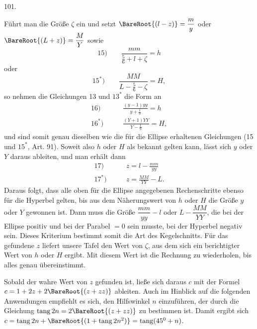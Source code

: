 \par{}\medskip
\hypertarget{native-141-article101}{}
\begin{center}101.\end{center}
Führt man die Größe $\zeta$ ein und setzt $\BareRoot{(l-z)}=\dfrac my$ oder $\BareRoot{(L+z)}=\dfrac MY$ sowie
\[
\mathrm{15)}\qquad\frac{mm}{\tfrac56+l+\zeta}=h
\]
\noindent oder
\[
\mathrm{15^*)}\qquad\frac{MM}{L-\tfrac56-\zeta}=H,
\]
\noindent so nehmen die Gleichungen 13 und $13^*$ die Form an
\[
\begin{aligned}
\mathrm{16)}\qquad&\frac{(y-1)yy}{y+\tfrac19}=h\\[.6em]
\mathrm{16^*)}\qquad&\frac{(Y+1)YY}{Y-\tfrac19}=H,
\end{aligned}
\]
\noindent und sind somit genau dieselben wie die für die Ellipse erhaltenen Gleichungen (15 und $15^*$, Art. 91). Soweit also $h$ oder $H$ als bekannt gelten kann, lässt sich $y$ oder $Y$ daraus ableiten, und man erhält dann
\[
\begin{aligned}
\mathrm{17)}\qquad&z=l-\frac{mm}{yy}\\[.6em]
\mathrm{17^*)}\qquad&z=\frac{MM}{YY}-L.
\end{aligned}
\]
\noindent Daraus folgt, dass alle oben für die Ellipse angegebenen Rechenschritte ebenso für die Hyperbel gelten, bis aus dem Näherungswert von $h$ oder $H$ die Größe $y$ oder $Y$ gewonnen ist. Dann muss die Größe $\dfrac{mm}{yy}-l$ oder $L-\dfrac{MM}{YY}$, die bei der Ellipse positiv und bei der Parabel $=0$ sein musste, bei der Hyperbel negativ sein. Dieses Kriterium bestimmt somit die Art des Kegelschnitts. Für das gefundene $z$ liefert unsere Tafel den Wert von $\zeta$, aus dem sich ein berichtigter Wert von $h$ oder $H$ ergibt. Mit diesem Wert ist die Rechnung zu wiederholen, bis alles genau übereinstimmt.
\par
Sobald der wahre Wert von $z$ gefunden ist, ließe sich daraus $c$ mit der Formel $c=1+2z+2\BareRoot{(z+zz)}$ ableiten. Auch im Hinblick auf die folgenden Anwendungen empfiehlt es sich, den Hilfswinkel $n$ einzuführen, der durch die Gleichung $\operatorname{tang}2n=2\BareRoot{(z+zz)}$ zu bestimmen ist. Damit ergibt sich $c=\operatorname{tang}2n+\BareRoot{(1+\operatorname{tang}2n^2)}=\operatorname{tang}(45^0+n)$.
